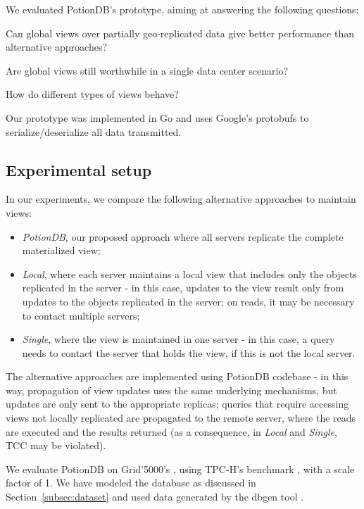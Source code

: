 \documentclass[sigplan,twocolumn,review,anonymous]{acmart}
\begin{document}
We evaluated PotionDB's prototype, aiming at answering the following questions: 
\begin{enumerate*}[label=(\roman*)]
	\item  \label{enum:q1} Can global views over partially geo-replicated data give better performance than alternative approaches? 	     
	\item \label{enum:q2} Are global views still worthwhile in a single data center scenario?
	\item \label{enum:q3} How do different types of views behave? 
\end{enumerate*}

Our prototype was implemented in Go and uses Google's protobufs to serialize/deserialize all data transmitted.

\subsection{Experimental setup}
\label{subsec:setup}

In our experiments, we compare the following alternative approaches to maintain views:
\begin{itemize}[leftmargin=*,noitemsep,topsep=0pt,parsep=0pt,partopsep=0pt]
	\item \emph{PotionDB}, our proposed approach where all servers replicate the complete materialized view;
	\item \emph{Local}, where each server maintains a local view that includes only the objects replicated in the server - in this case, 
	updates to the view result only from updates to the objects replicated in the server; 
	on reads, it may be necessary to contact multiple servers;
	\item \emph{Single}, where the view is maintained in one server - in this case, a query needs to 
	contact the server that holds the view, if this is not the local server. 
\end{itemize}
The alternative approaches are implemented using PotionDB codebase - in this way, propagation of view updates uses the same underlying mechanisms, but updates are only sent to the appropriate replicas; queries that require accessing views not locally replicated are propagated to the remote server, where the reads are executed and the results returned (as a consequence, in \textit{Local} and \textit{Single}, 
TCC may be violated).

We evaluate PotionDB on Grid'5000's \cite{Grid5000}, using TPC-H's benchmark \cite{tpch}, with a scale factor of 1. %
We have modeled the database as discussed in Section~\ref{subsec:dataset} and used data generated by the dbgen tool \cite{tpch}.
\end{document}
